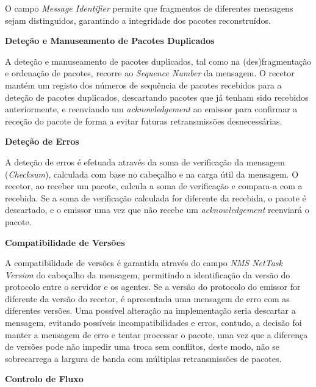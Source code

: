 \documentclass[a4paper,12pt]{scrreprt}
\begin{document}
O campo \textit{Message Identifier} permite que fragmentos de diferentes mensagens
sejam distinguidos, garantindo a integridade dos pacotes reconstruídos.


\clearpage

\textbf{Deteção e Manuseamento de Pacotes Duplicados}

A deteção e manuseamento de pacotes duplicados, tal como na (des)fragmentação
e ordenação de pacotes, recorre ao \textit{Sequence Number} da mensagem.
O recetor mantém um registo dos números de sequência de pacotes recebidos para a
deteção de pacotes duplicados, descartando pacotes que já tenham sido recebidos anteriormente, e
reenviando um \textit{acknowledgement} ao emissor para confirmar a receção do pacote
de forma a evitar futuras retransmissões desnecessárias.


\textbf{Deteção de Erros}

A deteção de erros é efetuada através da soma de verificação da mensagem (\textit{Checksum}),
calculada com base no cabeçalho e na carga útil da mensagem. O recetor, ao receber
um pacote, calcula a soma de verificação e compara-a com a recebida. Se a soma de
verificação calculada for diferente da recebida, o pacote é descartado, e o emissor
uma vez que não recebe um \textit{acknowledgement} reenviará o pacote.


\textbf{Compatibilidade de Versões}

A compatibilidade de versões é garantida através do campo \textit{NMS NetTask Version} do cabeçalho
da mensagem, permitindo a identificação da versão do protocolo entre o servidor e os agentes. Se a
versão do protocolo do emissor for diferente da versão do recetor, é apresentada uma mensagem de erro
com as diferentes versões. Uma possível alteração na implementação seria descartar a mensagem, evitando
possíveis incompatibilidades e erros, contudo, a decisão foi manter a mensagem de erro e tentar processar
o pacote, uma vez que a diferença de versões pode não impedir uma troca sem conflitos, deste modo, não
se sobrecarrega a largura de banda com múltiplas retransmissões de pacotes.


\textbf{Controlo de Fluxo}
\end{document}
